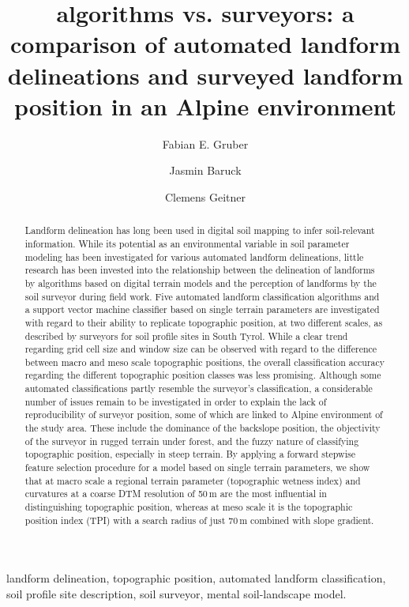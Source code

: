 \documentclass[preprint,12pt,authoryear]{elsarticle}
\begin{document}
\begin{frontmatter}

\title{algorithms vs. surveyors: a comparison of automated landform delineations and surveyed landform position in an Alpine environment}


\author{Fabian E. Gruber}
\author{Jasmin Baruck}
\author{Clemens Geitner}

\address{University of Innsbruck}

\begin{abstract}
Landform delineation has long been used in digital soil mapping to infer soil-relevant information. While its potential as an environmental variable in soil parameter modeling has been investigated for various automated landform delineations, little research has been invested into the relationship between the delineation of landforms by algorithms based on digital terrain models and the perception of landforms by the soil surveyor during field work. Five automated landform classification algorithms and a support vector machine classifier based on single terrain parameters are investigated  with regard to their ability to replicate topographic position, at two different scales, as described by surveyors for soil profile sites in South Tyrol. While a clear trend regarding grid cell size and window size can be observed with regard to the difference between macro and meso scale topographic positions, the overall classification accuracy regarding the different topographic position classes was less promising. Although some automated classifications partly resemble the surveyor's classification, a considerable number of issues remain to be investigated in order to explain the lack of reproducibility of surveyor position, some of which are linked to Alpine environment of the study area. These include the dominance of the backslope position, the objectivity of the surveyor in rugged terrain under forest, and the fuzzy nature of classifying topographic position, especially in steep terrain. By applying a forward stepwise feature selection procedure for a model based on single terrain parameters, we show that at macro scale a regional terrain parameter (topographic wetness index) and curvatures at a coarse DTM resolution of 50\,m are the most influential in distinguishing topographic position, whereas at meso scale it is the topographic position index (TPI) with a search radius of just 70\,m combined with slope gradient.  
 
\end{abstract}

\begin{keyword}
landform delineation, topographic position, automated landform classification, soil profile site description, soil surveyor, mental soil-landscape model.
\end{keyword}

\end{frontmatter}
\end{document}
